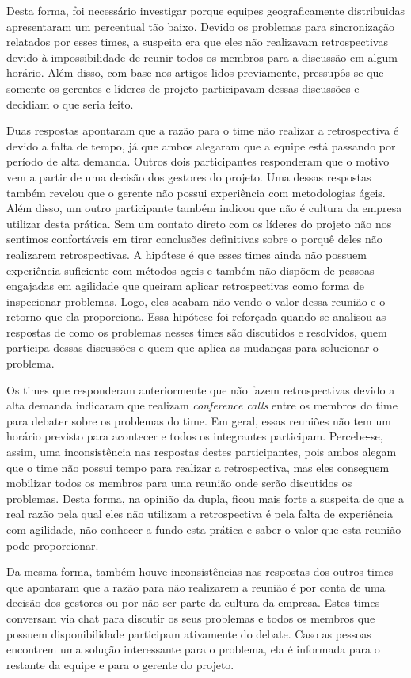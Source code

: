 Desta forma, foi necessário investigar porque equipes geograficamente distribuidas apresentaram um percentual tão baixo. Devido os problemas para sincronização relatados por esses times, a suspeita era que eles não realizavam retrospectivas devido à impossibilidade de reunir todos os membros para a discussão em algum horário. Além disso, com base nos artigos lidos previamente, pressupôs-se que somente os gerentes e líderes de projeto participavam dessas discussões e decidiam o que seria feito.
  
Duas respostas apontaram que a razão para o time não realizar a retrospectiva é devido a falta de tempo, já que ambos alegaram que a equipe está passando por período de alta demanda. Outros dois participantes responderam que o motivo vem a partir de uma decisão dos gestores do projeto. Uma dessas respostas também revelou que o gerente não possui experiência com metodologias ágeis. Além disso, um outro participante também indicou que não é cultura da empresa utilizar desta prática. Sem um contato direto com os líderes do projeto não nos sentimos confortáveis em tirar conclusões definitivas sobre o porquê deles não realizarem retrospectivas. A hipótese é que esses times ainda não possuem experiência suficiente com métodos ageis e também não dispõem de pessoas engajadas em agilidade que queiram aplicar retrospectivas como forma de inspecionar problemas. Logo, eles acabam não vendo o valor dessa reunião e o retorno que ela proporciona. Essa hipótese foi reforçada quando se analisou as respostas de como os problemas nesses times são discutidos e resolvidos, quem participa dessas discussões e quem que aplica as mudanças para solucionar o problema.

Os times que responderam anteriormente que não fazem retrospectivas devido a alta demanda indicaram que realizam \textit{conference calls} entre os membros do time para debater sobre os problemas do time. Em geral, essas reuniões não tem um horário previsto para acontecer e todos os integrantes participam. Percebe-se, assim, uma inconsistência nas respostas destes participantes, pois ambos alegam que o time não possui tempo para realizar a retrospectiva, mas eles conseguem mobilizar todos os membros para uma reunião onde serão discutidos os problemas. Desta forma, na opinião da dupla, ficou mais forte a suspeita de que a real razão pela qual eles não utilizam a retrospectiva é pela falta de experiência com agilidade, não conhecer a fundo esta prática e saber o valor que esta reunião pode proporcionar.

Da mesma forma, também houve inconsistências nas respostas dos outros times que apontaram que a razão para não realizarem a reunião é por conta de uma decisão dos gestores ou por não ser parte da cultura da empresa. Estes times conversam via chat para discutir os seus problemas e todos os membros que possuem disponibilidade participam ativamente do debate. Caso as pessoas encontrem uma solução interessante para o problema, ela é informada para o restante da equipe e para o gerente do projeto. 

